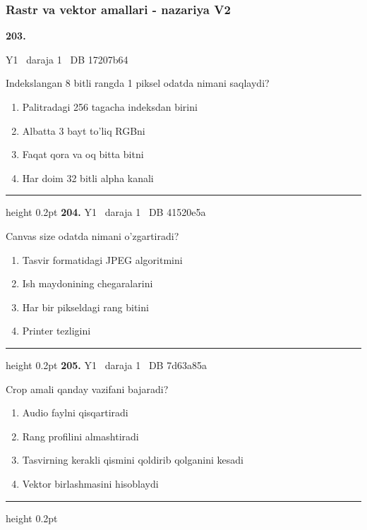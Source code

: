 \documentclass[10pt,a4paper,oneside]{article}
\begin{document}
\subsubsection{Rastr va vektor amallari - nazariya V2}
\hypertarget{q203}{\textbf{\color{ink}203.}}  {\color{muted}\scriptsize Y1 \textbullet\ daraja 1 \textbullet\ DB 17207b64}
\par
Indekslangan 8 bitli rangda 1 piksel odatda nimani saqlaydi?
\begin{enumerate}[label=\Alph*),leftmargin=9mm]
\item Palitradagi 256 tagacha indeksdan birini
\item Albatta 3 bayt to'liq RGBni
\item Faqat qora va oq bitta bitni
\item Har doim 32 bitli alpha kanali
\end{enumerate}
\vspace{2mm}\hrule height 0.2pt \vspace{4mm}
\hypertarget{q204}{\textbf{\color{ink}204.}}  {\color{muted}\scriptsize Y1 \textbullet\ daraja 1 \textbullet\ DB 41520e5a}
\par
Canvas size odatda nimani o'zgartiradi?
\begin{enumerate}[label=\Alph*),leftmargin=9mm]
\item Tasvir formatidagi JPEG algoritmini
\item Ish maydonining chegaralarini
\item Har bir pikseldagi rang bitini
\item Printer tezligini
\end{enumerate}
\vspace{2mm}\hrule height 0.2pt \vspace{4mm}
\hypertarget{q205}{\textbf{\color{ink}205.}}  {\color{muted}\scriptsize Y1 \textbullet\ daraja 1 \textbullet\ DB 7d63a85a}
\par
Crop amali qanday vazifani bajaradi?
\begin{enumerate}[label=\Alph*),leftmargin=9mm]
\item Audio faylni qisqartiradi
\item Rang profilini almashtiradi
\item Tasvirning kerakli qismini qoldirib qolganini kesadi
\item Vektor birlashmasini hisoblaydi
\end{enumerate}
\vspace{2mm}\hrule height 0.2pt \vspace{4mm}
\end{document}
